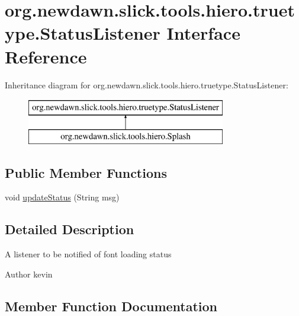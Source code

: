 \hypertarget{interfaceorg_1_1newdawn_1_1slick_1_1tools_1_1hiero_1_1truetype_1_1_status_listener}{}\section{org.\+newdawn.\+slick.\+tools.\+hiero.\+truetype.\+Status\+Listener Interface Reference}
\label{interfaceorg_1_1newdawn_1_1slick_1_1tools_1_1hiero_1_1truetype_1_1_status_listener}
Inheritance diagram for org.\+newdawn.\+slick.\+tools.\+hiero.\+truetype.\+Status\+Listener\+:\begin{figure}[H]
\begin{center}
\leavevmode
\includegraphics[height=2.000000cm]{interfaceorg_1_1newdawn_1_1slick_1_1tools_1_1hiero_1_1truetype_1_1_status_listener}
\end{center}
\end{figure}
\subsection*{Public Member Functions}
\begin{DoxyCompactItemize}
\item 
void \mbox{\hyperlink{interfaceorg_1_1newdawn_1_1slick_1_1tools_1_1hiero_1_1truetype_1_1_status_listener_a60c730e33b5466c1801b3e545c8dbd6d}{update\+Status}} (String msg)
\end{DoxyCompactItemize}


\subsection{Detailed Description}
A listener to be notified of font loading status

\begin{DoxyAuthor}{Author}
kevin 
\end{DoxyAuthor}


\subsection{Member Function Documentation}
\mbox{\label{interfaceorg_1_1newdawn_1_1slick_1_1tools_1_1hiero_1_1truetype_1_1_status_listener_a60c730e33b5466c1801b3e545c8dbd6d}} 

